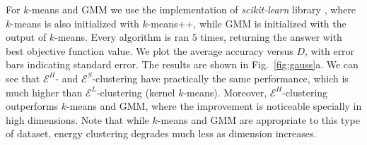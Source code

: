\documentclass[aps,preprint,nofootinbib,floatfix]{revtex4-1}
\begin{document}
For $k$-means and GMM we use the implementation of \emph{scikit-learn} library
\cite{scikit-learn}, where $k$-means is also initialized with $k$-means++,
while GMM is initialized with the output of $k$-means. Every algorithm
is ran $5$ times, returning the answer with best objective function value.
We plot the average accuracy versus $D$, with error bars indicating
standard error.
The results are shown in Fig.~\ref{fig:gauss}a. We can see that
$\mathcal{E}^H$- and $\mathcal{E}^S$-clustering have practically
the same performance, which is 
much higher than $\mathcal{E}^L$-clustering (kernel
$k$-means). Moreover, $\mathcal{E}^H$-clustering outperforms 
$k$-means and GMM, where the improvement is noticeable specially in 
high dimensions.
Note that while $k$-means and GMM are appropriate to this type of 
dataset, energy clustering degrades much less as dimension increases.
\end{document}
